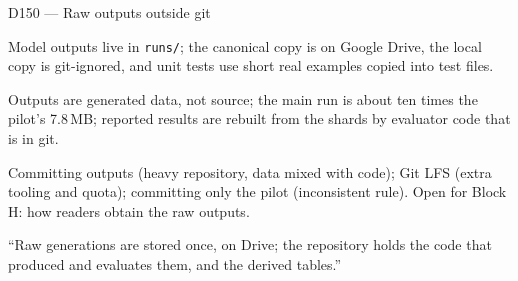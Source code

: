 \documentclass[11pt,a4paper]{report}
\begin{document}
\begin{decisionbox}{D150 --- Raw outputs outside git}
\begin{description}[nosep, leftmargin=0pt]
  \item[Decision.] Model outputs live in \texttt{runs/}; the canonical copy is on Google Drive, the local copy is git-ignored, and unit tests use short real examples copied into test files.
  \item[Why.] Outputs are generated data, not source; the main run is about ten times the pilot's 7.8\,MB; reported results are rebuilt from the shards by evaluator code that is in git.
  \item[Alternatives.] Committing outputs (heavy repository, data mixed with code); Git LFS (extra tooling and quota); committing only the pilot (inconsistent rule). Open for Block H: how readers obtain the raw outputs.
  \item[Interview line.] ``Raw generations are stored once, on Drive; the repository holds the code that produced and evaluates them, and the derived tables.''
\end{description}
\end{decisionbox}
\end{document}
